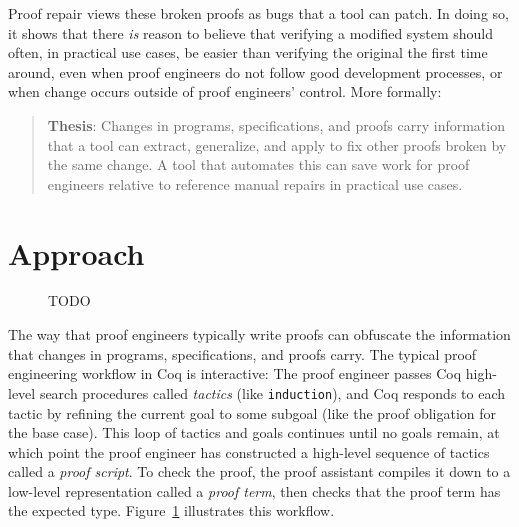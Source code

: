 Proof repair views these broken proofs as bugs that a tool can patch.
In doing so, it shows that there \textit{is} reason to believe that verifying a modified system should often, in practical use cases, be easier than verifying the original the first time around,
even when proof engineers do not follow good development processes,
or when change occurs outside of proof engineers' control.
More formally:

\begin{quote}
\textbf{Thesis}: Changes in programs, specifications, and proofs carry information that a tool can extract, generalize, and apply to fix other proofs broken by the same change. A tool that automates this can save work for proof engineers relative to reference manual repairs in practical use cases.
\end{quote}

\section{Approach}

\begin{figure}
\caption{TODO}
\label{fig:workflow}
\end{figure}



The way that proof engineers typically write proofs can obfuscate the information that changes in programs, specifications, and proofs carry.
The typical proof engineering workflow in Coq is interactive: The proof engineer passes Coq high-level
search procedures called \textit{tactics} (like \lstinline{induction}), and Coq responds to each tactic
by refining the current goal to some subgoal (like the proof obligation for the base case). This loop of tactics and goals 
continues until no goals remain, at which point the proof engineer has constructed a high-level sequence of tactics called a \textit{proof script}.
To check the proof, the proof assistant compiles it down to a low-level representation called a \textit{proof term},
then checks that the proof term has the expected type.
Figure~\ref{fig:workflow} illustrates this workflow.

